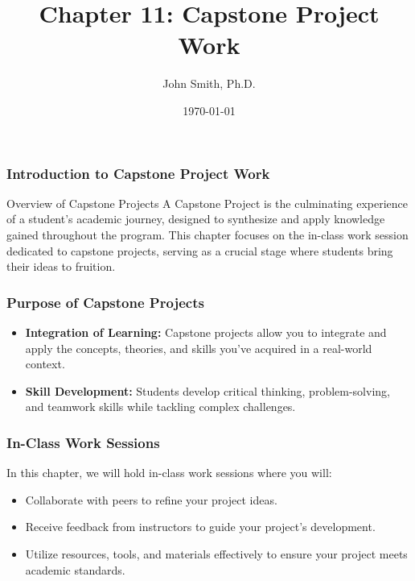\documentclass[aspectratio=169]{beamer}
\title[Chapter 11: Capstone Project Work]{Chapter 11: Capstone Project Work}
\author[J. Smith]{John Smith, Ph.D.}
\institute[University Name]{
  Department of Computer Science\\
  University Name\\
  \vspace{0.3cm}
  Email: email@university.edu\\
  Website: www.university.edu
}
\date{\today}
\begin{document}
\frame{\titlepage}

\begin{frame}[fragile]
    \frametitle{Introduction to Capstone Project Work}
    \begin{block}{Overview of Capstone Projects}
        A Capstone Project is the culminating experience of a student's academic journey, designed to synthesize and apply knowledge gained throughout the program. This chapter focuses on the in-class work session dedicated to capstone projects, serving as a crucial stage where students bring their ideas to fruition.
    \end{block}
\end{frame}

\begin{frame}[fragile]
    \frametitle{Purpose of Capstone Projects}
    \begin{itemize}
        \item \textbf{Integration of Learning:} Capstone projects allow you to integrate and apply the concepts, theories, and skills you've acquired in a real-world context.
        \item \textbf{Skill Development:} Students develop critical thinking, problem-solving, and teamwork skills while tackling complex challenges.
    \end{itemize}
\end{frame}

\begin{frame}[fragile]
    \frametitle{In-Class Work Sessions}
    In this chapter, we will hold in-class work sessions where you will:
    \begin{itemize}
        \item Collaborate with peers to refine your project ideas.
        \item Receive feedback from instructors to guide your project’s development.
        \item Utilize resources, tools, and materials effectively to ensure your project meets academic standards.
    \end{itemize}
\end{frame}
\end{document}
